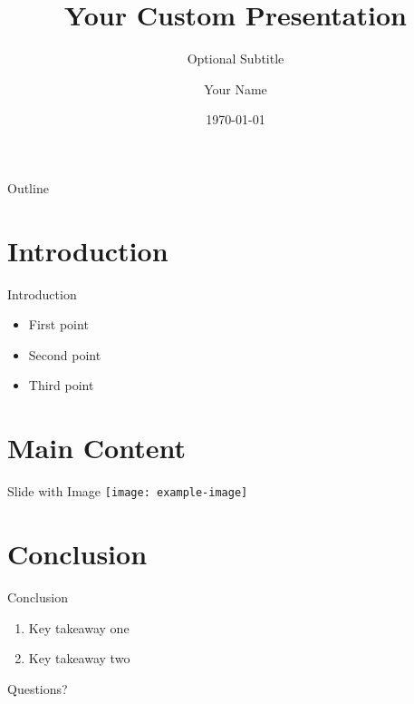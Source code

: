 \documentclass{beamer}
\title{Your Custom Presentation}
\subtitle{Optional Subtitle}
\author{Your Name}
\institute{Your University}
\date{\today}
\begin{document}
{
\begin{frame}
  \titlepage
\end{frame}
}


\begin{frame}{Outline}
  \tableofcontents
\end{frame}

\section{Introduction}

\begin{frame}{Introduction}
  \begin{itemize}
    \item First point
    \item Second point
    \item Third point
  \end{itemize}
\end{frame}

\section{Main Content}

\begin{frame}{Slide with Image}
  \texttt{[image: example-image]}
\end{frame}

\section{Conclusion}

\begin{frame}{Conclusion}
  \begin{enumerate}
    \item Key takeaway one
    \item Key takeaway two
  \end{enumerate}
\end{frame}

\begin{frame}
  \centering \Huge Questions?
\end{frame}
\end{document}

